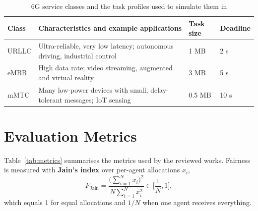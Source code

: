 \documentclass[12pt,a4paper,final]{extreport}
\begin{document}
{\renewcommand{\arraystretch}{1.2}
\begin{table}[htbp]
\centering
\caption{6G service classes and the task profiles used to simulate them in \cite{p2}}\label{tab:services}
\small
\begin{tabularx}{\textwidth}{|p{2.0cm}|X|p{1.7cm}|p{1.7cm}|}
\hline
\textbf{Class} & \textbf{Characteristics and example applications} & \textbf{Task size} & \textbf{Deadline} \\ \hline
URLLC & Ultra-reliable, very low latency; autonomous driving, industrial control & 1 MB & 2 s \\ \hline
eMBB & High data rate; video streaming, augmented and virtual reality & 3 MB & 5 s \\ \hline
mMTC & Many low-power devices with small, delay-tolerant messages; IoT sensing & 0.5 MB & 10 s \\ \hline
\end{tabularx}
\end{table}}

\section{Evaluation Metrics}

\paragraph{} Table~\ref{tab:metrics} summarises the metrics used by the reviewed works. Fairness is measured with \textbf{Jain's index} over per-agent allocations $x_i$,
\begin{equation}
F_{\mathrm{Jain}}=\frac{\big(\sum_{i=1}^{N}x_i\big)^{2}}{N\sum_{i=1}^{N}x_i^{2}}\in\Big[\frac{1}{N},1\Big],
\label{eq:jain}
\end{equation}
which equals 1 for equal allocations and $1/N$ when one agent receives everything.
\end{document}
